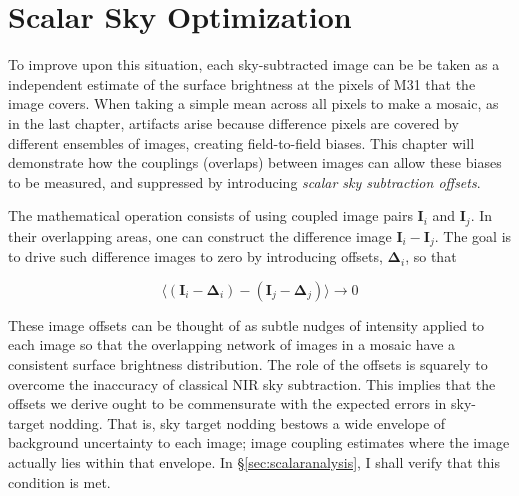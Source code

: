 \documentclass[iop]{emulateapj}
\newcommand{\vect}[1]{\boldsymbol{#1}} %
\begin{document}

\section{Scalar Sky Optimization} %
\label{sec:scalarsky}

To improve upon this situation, each sky-subtracted image can be be taken as a independent estimate of the surface brightness at the pixels of M31 that the image covers. When taking a simple mean across all pixels to make a mosaic, as in the last chapter, artifacts arise because difference pixels are covered by different ensembles of images, creating field-to-field biases. This chapter will demonstrate how the couplings (overlaps) between images can allow these biases to be measured, and suppressed by introducing \emph{scalar sky subtraction offsets}.

The mathematical operation consists of using coupled image pairs $\vect{I}_i$ and $\vect{I}_j$. In their overlapping areas, one can construct the difference image $\vect{I}_i - \vect{I}_j$.
The goal is to drive such difference images to zero by introducing offsets, $\vect{\Delta}_i$, so that

\begin{equation}
    \langle (\vect{I}_i-\vect{\Delta}_i) - (\vect{I}_j-\vect{\Delta}_j) \rangle \rightarrow 0
    \label{eq:offsettheory}
\end{equation}

These image offsets can be thought of as subtle nudges of intensity applied to each image so that the overlapping network of images in a mosaic have a consistent surface brightness distribution. The role of the offsets is squarely to overcome the inaccuracy of classical NIR sky subtraction. This implies that the offsets we derive ought to be commensurate with the expected errors in sky-target nodding. That is, sky target nodding bestows a wide envelope of background uncertainty to each image; image coupling estimates where the image actually lies within that envelope. In \S \ref{sec:scalaranalysis}, I shall verify that this condition is met.
\end{document}
